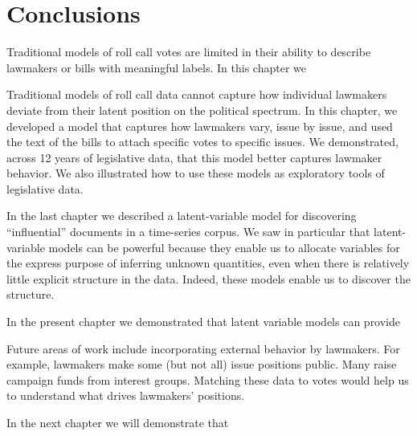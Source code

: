 
\section*{Conclusions}

Traditional models of roll call votes are limited in their ability to
describe lawmakers or bills with meaningful labels.  In this chapter we 

Traditional models of
roll call data cannot capture how individual lawmakers deviate from
their latent position on the political spectrum. In this chapter, we
developed a model that captures how lawmakers vary, issue by issue,
and used the text of the bills to attach specific votes to specific
issues.  We demonstrated, across 12 years of legislative data, that
this model better captures lawmaker behavior.  We also illustrated how
to use these models as exploratory tools of legislative data.

In the last chapter we described a latent-variable model for
discovering ``influential'' documents in a time-series corpus.  We saw
in particular that latent-variable models can be powerful because they
enable us to allocate variables for the express purpose of inferring
unknown quantities, even when there is relatively little explicit
structure in the data.  Indeed, these models enable us to discover the
structure.

In the present chapter we demonstrated that latent variable models can provide

Future areas of work include incorporating external behavior by
lawmakers.  For example, lawmakers make some (but not all) issue
positions public.  Many raise campaign funds from interest
groups. Matching these data to votes would help us to understand what
drives lawmakers' positions.

In the next chapter we will demonstrate that 

